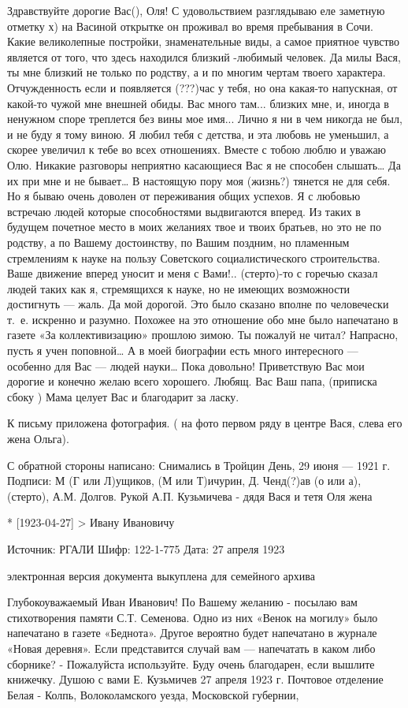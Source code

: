 \documentclass[]{memoir}
\begin{document}
Здравствуйте дорогие Вас(), Оля!
С удовольствием разглядываю еле заметную отметку х) на  Васиной открытке он проживал во время пребывания в Сочи. Какие великолепные постройки, знаменательные виды, а самое приятное чувство является от того, что здесь находился близкий -любимый человек. Да милы Вася, ты мне близкий не только по родству, а и по многим чертам твоего характера. Отчужденность если и появляется (???)час у тебя, но она какая-то напускная, от какой-то чужой  мне внешней обиды. Вас много там... близких мне, и, иногда в ненужном споре треплется без вины мое имя... Лично я ни в чем никогда не был, и не буду я тому виною. Я любил тебя с детства, и эта любовь не уменьшил, а скорее увеличил к тебе во всех отношениях. Вместе с тобою люблю и уважаю Олю. Никакие разговоры неприятно касающиеся Вас я не способен слышать… Да их при мне и не бывает…
В настоящую пору моя (жизнь?) тянется не для себя. Но я бываю очень доволен от переживания общих успехов. Я с любовью встречаю людей которые способностями выдвигаются вперед. Из таких в будущем почетное место в моих желаниях твое и твоих братьев, но это не по родству, а по Вашему достоинству, по Вашим поздним, но пламенным стремлениям к науке на пользу Советского социалистического строительства. 
Ваше движение вперед уносит и меня с Вами!..
(стерто)-то с горечью сказал людей таких как я, стремящихся к науке, но не имеющих возможности достигнуть — жаль. Да мой дорогой. Это было сказано вполне по человечески т. е. искренно и разумно. Похожее на это отношение обо мне было напечатано в газете «За коллективизацию» прошлою зимою. Ты пожалуй не читал? Напрасно, пусть я учен поповной… А в моей биографии есть много интересного — особенно для Вас — людей науки… Пока довольно! Приветствую Вас мои дорогие и конечно желаю всего хорошего.
Любящ. Вас Ваш папа,
(приписка сбоку ) Мама целует Вас и благодарит за ласку.

К письму приложена фотография. ( на фото первом ряду в центре Вася, слева его жена Ольга).  

С обратной стороны написано:
Снимались в Тройцин День, 29 июня — 1921 г.
Подписи: М (Г или Л)ущиков, (М или Т)ичурин, Д. Ченд(?)ав (о или а),  (стерто), А.М. Долгов. 
Рукой А.П. Кузьмичева -  дядя Вася и тетя Оля жена 

* [1923-04-27] > Ивану Ивановичу 

Источник: РГАЛИ
Шифр: 122-1-775
Дата: 27 апреля 1923

электронная версия документа выкуплена для семейного архива

Глубокоуважаемый Иван Иванович!
По Вашему желанию - посылаю вам стихотворения памяти С.Т. Семенова. Одно из них «Венок на могилу» было напечатано в газете «Беднота». Другое вероятно будет напечатано в журнале «Новая деревня». Если представится случай вам — напечатать в каком либо сборнике? - Пожалуйста используйте. Буду очень благодарен, если вышлите книжечку.
Душою с вами Е. Кузьмичев
27 апреля 1923 г.
Почтовое отделение Белая - Колпь, Волоколамского уезда, Московской губернии,
\end{document}
